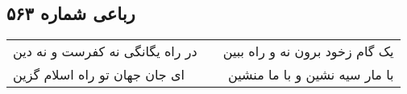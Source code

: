 \begin{center}
\section*{رباعی شماره ۵۶۳}
\label{sec:sh563}
\begin{longtable}{l p{0.5cm} r}
در راه یگانگی نه کفرست و نه دین
&&
یک گام زخود برون نه و راه ببین
\\
ای جان جهان تو راه اسلام گزین
&&
با مار سیه نشین و با ما منشین
\\
\end{longtable}
\end{center}
